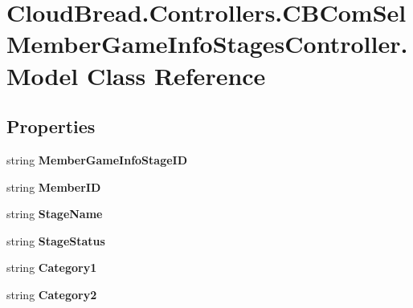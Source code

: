 \hypertarget{a00158}{}\section{Cloud\+Bread.\+Controllers.\+C\+B\+Com\+Sel\+Member\+Game\+Info\+Stages\+Controller.\+Model Class Reference}
\label{a00158}
\subsection*{Properties}
\begin{DoxyCompactItemize}
\item 
string {\bfseries Member\+Game\+Info\+Stage\+ID}\hypertarget{a00158_a9f9a32af5ae0cec27e68894cc02d76ae}{}\label{a00158_a9f9a32af5ae0cec27e68894cc02d76ae}

\item 
string {\bfseries Member\+ID}\hypertarget{a00158_aee24fa96f6bf7ad0dbaf93e6eb25de77}{}\label{a00158_aee24fa96f6bf7ad0dbaf93e6eb25de77}

\item 
string {\bfseries Stage\+Name}\hypertarget{a00158_ac276ea4cbfcf93477148f6af17d2c426}{}\label{a00158_ac276ea4cbfcf93477148f6af17d2c426}

\item 
string {\bfseries Stage\+Status}\hypertarget{a00158_a023a02da4eb679212b4f69c8d76ec6c3}{}\label{a00158_a023a02da4eb679212b4f69c8d76ec6c3}

\item 
string {\bfseries Category1}\hypertarget{a00158_a7ef4c6830e8b2881b2273611864bf672}{}\label{a00158_a7ef4c6830e8b2881b2273611864bf672}

\item 
string {\bfseries Category2}\hypertarget{a00158_a375c9e487c536c850b70472821a81f53}{}\label{a00158_a375c9e487c536c850b70472821a81f53}


\end{DoxyCompactItemize}

